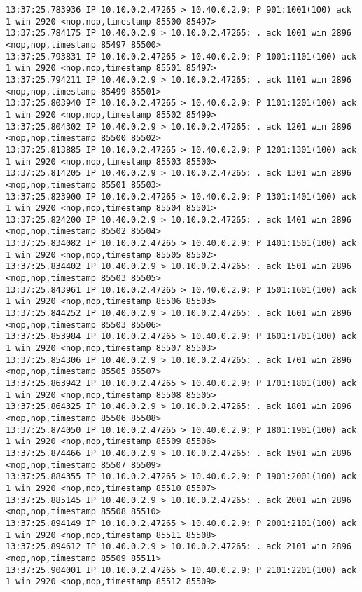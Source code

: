 \documentclass[a4paper,12pt]{article}
\begin{document}
\begin{lstlisting}
13:37:25.783936 IP 10.10.0.2.47265 > 10.40.0.2.9: P 901:1001(100) ack 1 win 2920 <nop,nop,timestamp 85500 85497>
13:37:25.784175 IP 10.40.0.2.9 > 10.10.0.2.47265: . ack 1001 win 2896 <nop,nop,timestamp 85497 85500>
13:37:25.793831 IP 10.10.0.2.47265 > 10.40.0.2.9: P 1001:1101(100) ack 1 win 2920 <nop,nop,timestamp 85501 85497>
13:37:25.794211 IP 10.40.0.2.9 > 10.10.0.2.47265: . ack 1101 win 2896 <nop,nop,timestamp 85499 85501>
13:37:25.803940 IP 10.10.0.2.47265 > 10.40.0.2.9: P 1101:1201(100) ack 1 win 2920 <nop,nop,timestamp 85502 85499>
13:37:25.804302 IP 10.40.0.2.9 > 10.10.0.2.47265: . ack 1201 win 2896 <nop,nop,timestamp 85500 85502>
13:37:25.813885 IP 10.10.0.2.47265 > 10.40.0.2.9: P 1201:1301(100) ack 1 win 2920 <nop,nop,timestamp 85503 85500>
13:37:25.814205 IP 10.40.0.2.9 > 10.10.0.2.47265: . ack 1301 win 2896 <nop,nop,timestamp 85501 85503>
13:37:25.823900 IP 10.10.0.2.47265 > 10.40.0.2.9: P 1301:1401(100) ack 1 win 2920 <nop,nop,timestamp 85504 85501>
13:37:25.824200 IP 10.40.0.2.9 > 10.10.0.2.47265: . ack 1401 win 2896 <nop,nop,timestamp 85502 85504>
13:37:25.834082 IP 10.10.0.2.47265 > 10.40.0.2.9: P 1401:1501(100) ack 1 win 2920 <nop,nop,timestamp 85505 85502>
13:37:25.834402 IP 10.40.0.2.9 > 10.10.0.2.47265: . ack 1501 win 2896 <nop,nop,timestamp 85503 85505>
13:37:25.843961 IP 10.10.0.2.47265 > 10.40.0.2.9: P 1501:1601(100) ack 1 win 2920 <nop,nop,timestamp 85506 85503>
13:37:25.844252 IP 10.40.0.2.9 > 10.10.0.2.47265: . ack 1601 win 2896 <nop,nop,timestamp 85503 85506>
13:37:25.853984 IP 10.10.0.2.47265 > 10.40.0.2.9: P 1601:1701(100) ack 1 win 2920 <nop,nop,timestamp 85507 85503>
13:37:25.854306 IP 10.40.0.2.9 > 10.10.0.2.47265: . ack 1701 win 2896 <nop,nop,timestamp 85505 85507>
13:37:25.863942 IP 10.10.0.2.47265 > 10.40.0.2.9: P 1701:1801(100) ack 1 win 2920 <nop,nop,timestamp 85508 85505>
13:37:25.864325 IP 10.40.0.2.9 > 10.10.0.2.47265: . ack 1801 win 2896 <nop,nop,timestamp 85506 85508>
13:37:25.874050 IP 10.10.0.2.47265 > 10.40.0.2.9: P 1801:1901(100) ack 1 win 2920 <nop,nop,timestamp 85509 85506>
13:37:25.874466 IP 10.40.0.2.9 > 10.10.0.2.47265: . ack 1901 win 2896 <nop,nop,timestamp 85507 85509>
13:37:25.884355 IP 10.10.0.2.47265 > 10.40.0.2.9: P 1901:2001(100) ack 1 win 2920 <nop,nop,timestamp 85510 85507>
13:37:25.885145 IP 10.40.0.2.9 > 10.10.0.2.47265: . ack 2001 win 2896 <nop,nop,timestamp 85508 85510>
13:37:25.894149 IP 10.10.0.2.47265 > 10.40.0.2.9: P 2001:2101(100) ack 1 win 2920 <nop,nop,timestamp 85511 85508>
13:37:25.894612 IP 10.40.0.2.9 > 10.10.0.2.47265: . ack 2101 win 2896 <nop,nop,timestamp 85509 85511>
13:37:25.904001 IP 10.10.0.2.47265 > 10.40.0.2.9: P 2101:2201(100) ack 1 win 2920 <nop,nop,timestamp 85512 85509>

\end{lstlisting}
\end{document}
